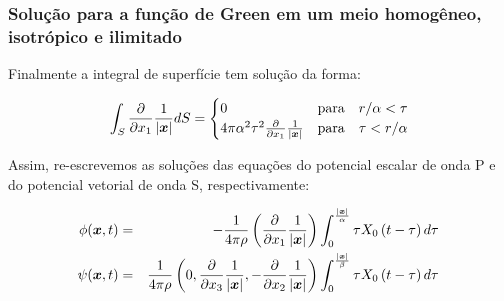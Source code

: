 \documentclass{beamer}
\newcommand{\xvec}{\vc{x}}
\begin{document}
\begin{frame}
	\frametitle{\textbf{Solu\c{c}\~ao para a fun\c{c}\~ao de Green em um meio homog\^eneo, isotr\'opico e ilimitado}}
	
	\begin{flushleft}
		Finalmente a integral de superf\'icie tem solu\c{c}\~ao da forma:
	\end{flushleft}
	\begin{align*}
	\int_{S} \frac{\partial}{\partial x_1 } \frac{1}{\left| \xvec \right| }dS =\begin{cases}
	0  &\mbox{para}\quad  r/\alpha < \tau\\
	4\pi \alpha^2 \tau^2 \frac{\partial }{\partial x_1} \frac{1}{|\xvec|}  &\mbox{para}\quad \tau < r/\alpha
	\end{cases}
	\end{align*}
	
	\begin{flushleft}
		Assim, re-escrevemos as solu\c{c}\~oes das equa\c{c}\~oes do potencial escalar de onda P e 
		do potencial vetorial de onda S, respectivamente: 
	\end{flushleft}
	\begin{eqnarray}
	\label{ten1}
	\phi(\xvec,t) &=& - \frac{1}{4\pi \rho}  \left( \frac{\partial }{\partial x_1} \frac{1}{\left| \xvec\right|} \right)  \int_{0}^{\frac{\left| \xvec\right|}{\alpha}} \tau X_{0}\left( t -\tau \right)  d\tau\, \\
	\psi(\xvec,t) &=& \frac{1}{4\pi\rho}  \left(0, \frac{\partial }{\partial x_3} \frac{1}{\left| \xvec \right|}, -\frac{\partial }{\partial x_2} \frac{1}{\left| \xvec \right|} \right) \int_{0}^{\frac{\left| \xvec\right|}{\beta}} \tau X_{0}\left( t -\tau \right)  d\tau\, 
	\end{eqnarray}
	
\end{frame}%
\end{document}
